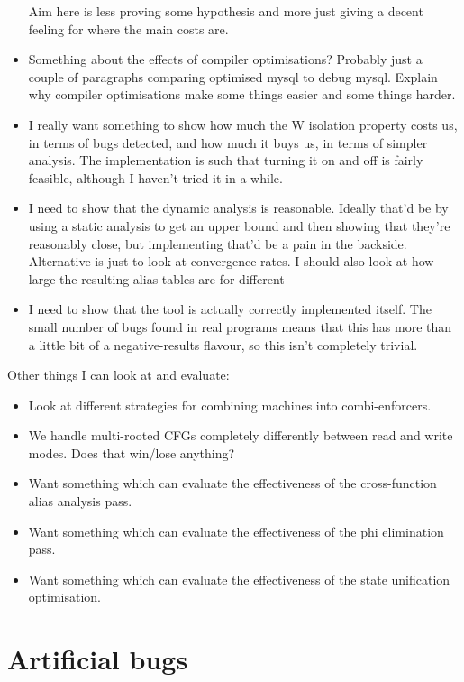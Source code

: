 \begin{itemize}
  Aim here is less proving some hypothesis and more just giving a
  decent feeling for where the main costs are.
\item Something about the effects of compiler optimisations?  Probably
  just a couple of paragraphs comparing optimised mysql to debug
  mysql.  Explain why compiler optimisations make some things easier
  and some things harder.
\item I really want something to show how much the W isolation
  property costs us, in terms of bugs detected, and how much it buys
  us, in terms of simpler analysis.  The implementation is such that
  turning it on and off is fairly feasible, although I haven't tried
  it in a while.
\item I need to show that the dynamic analysis is reasonable.  Ideally
  that'd be by using a static analysis to get an upper bound and then
  showing that they're reasonably close, but implementing that'd be a
  pain in the backside.  Alternative is just to look at convergence
  rates.  I should also look at how large the resulting alias tables
  are for different 
\item I need to show that the tool is actually correctly implemented
  itself.  The small number of bugs found in real programs means that
  this has more than a little bit of a negative-results flavour, so
  this isn't completely trivial.
\end{itemize}

Other things I can look at and evaluate:

\begin{itemize}
\item
  Look at different strategies for combining machines into
  combi-enforcers.
\item
  We handle multi-rooted CFGs completely differently between read and
  write modes.  Does that win/lose anything?
\item
  Want something which can evaluate the effectiveness of the
  cross-function alias analysis pass.
\item
  Want something which can evaluate the effectiveness of the phi
  elimination pass.
\item
  Want something which can evaluate the effectiveness of the state
  unification optimisation.
\end{itemize}

\section{Artificial bugs}

